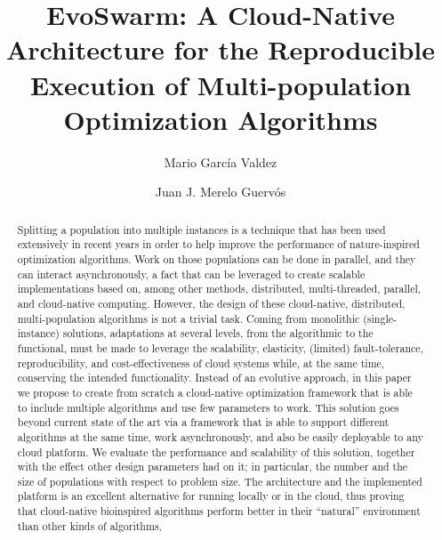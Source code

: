 \documentclass[review]{elsarticle}
\begin{document}
\lstset{language=Python} 
\begin{frontmatter}

\title{EvoSwarm: A Cloud-Native Architecture for the Reproducible Execution of Multi-population Optimization Algorithms}

\author[itt]{Mario Garc\'ia Valdez}

\author[granada]{Juan J. Merelo Guerv\'os}

\address[itt]{Department of Graduate Studies, Instituto Tecnol\'ogico de Tijuana, Tijuana BC, Mexico}
\address[granada]{Department of Computer Architecture and Technology, Universidad de Granada, Granada, Spain}

\begin{abstract} 
Splitting a population into multiple instances is a technique that has
been used extensively in recent years in order to help improve the
performance of nature-inspired optimization algorithms. Work on those
populations can be done in parallel, and they can interact asynchronously,
a fact that can be leveraged to create scalable implementations based
on, among other methods, distributed, multi-threaded, parallel, and
cloud-native computing.  However, the design of these cloud-native,
distributed, multi-population algorithms is not a trivial task. Coming
from monolithic (single-instance) solutions, adaptations at several
levels, from the algorithmic to the functional, must be made to
leverage the scalability, elasticity, (limited) fault-tolerance,
reproducibility, and cost-effectiveness of cloud systems while, at the
same time, conserving the intended functionality. Instead of an
evolutive approach, in this paper we propose to create from scratch a
cloud-native optimization framework that is able to include multiple
algorithms and use few parameters to work. This solution goes beyond
current state of the art via a framework that is able to support
different algorithms at the same time, work asynchronously, and also
be easily deployable to any cloud platform. We evaluate the
performance and scalability of this solution, together with the effect
other design parameters had on it; in particular, the number and the
size of populations with respect to problem size. The architecture and
the implemented platform is an excellent alternative for running
locally or in the cloud, thus proving that cloud-native bioinspired
algorithms perform better in their ``natural'' environment than other
kinds of algorithms, %


\end{abstract}
\end{frontmatter}
\end{document}
